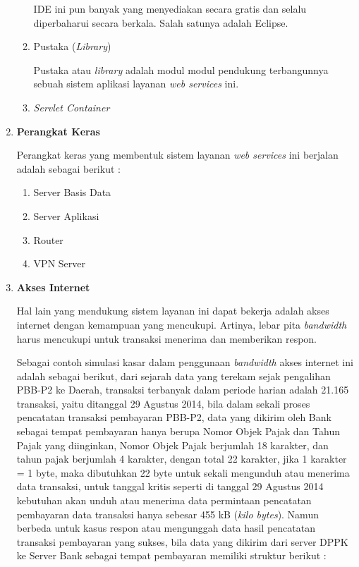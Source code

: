 \documentclass[pdftex,12pt, oneside]{article}
\begin{document}
\begin{enumerate}
\begin{enumerate}
  IDE ini pun banyak yang menyediakan secara gratis dan selalu diperbaharui secara berkala. Salah satunya adalah Eclipse.
  
  \item Pustaka (\textit{Library})
  
  Pustaka atau \textit{library} adalah modul modul pendukung terbangunnya sebuah sistem aplikasi layanan \textit{web services} ini.
  
  \item \textit{Servlet Container}
\end{enumerate}

\item \textbf{Perangkat Keras}

Perangkat keras yang membentuk sistem layanan \textit{web services} ini berjalan adalah sebagai berikut :

\begin{enumerate}
  \item Server Basis Data
  \item Server Aplikasi
  \item Router
  \item VPN Server
\end{enumerate}

\item \textbf{Akses Internet}

Hal lain yang mendukung sistem layanan ini dapat bekerja adalah akses internet dengan kemampuan yang mencukupi. Artinya, lebar pita \textit{bandwidth} harus mencukupi untuk transaksi menerima dan memberikan respon.

Sebagai contoh simulasi kasar dalam penggunaan \textit{bandwidth} akses internet ini adalah sebagai berikut, dari sejarah data yang terekam sejak pengalihan PBB-P2 ke Daerah, transaksi terbanyak dalam periode harian adalah 21.165 transaksi, yaitu ditanggal 29 Agustus 2014, bila dalam sekali proses pencatatan transaksi pembayaran PBB-P2, data yang dikirim oleh Bank sebagai tempat pembayaran hanya berupa Nomor Objek Pajak dan Tahun Pajak yang diinginkan, Nomor Objek Pajak berjumlah 18 karakter, dan tahun pajak berjumlah 4 karakter, dengan total 22 karakter, jika 1 karakter = 1 byte, maka dibutuhkan 22 byte untuk sekali mengunduh atau menerima data transaksi, untuk tanggal kritis seperti di tanggal 29 Agustus 2014 kebutuhan akan unduh atau menerima data permintaan pencatatan pembayaran data transaksi hanya sebesar 455 kB (\textit{kilo bytes}). Namun berbeda untuk kasus respon atau mengunggah data hasil pencatatan transaksi pembayaran yang sukses, bila data yang dikirim dari server DPPK ke Server Bank sebagai tempat pembayaran memiliki struktur berikut :


\end{enumerate}
\end{document}
